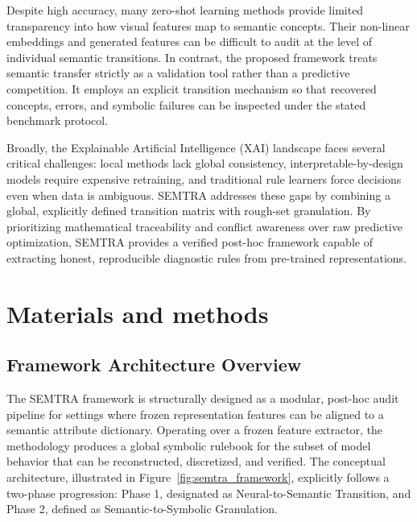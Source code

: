 \documentclass[make,article,submit,pdftex,moreauthors]{Definitions/mdpi}
\begin{document}
Despite high accuracy, many zero-shot learning methods provide limited transparency into how visual features map to semantic concepts. Their non-linear embeddings and generated features can be difficult to audit at the level of individual semantic transitions. In contrast, the proposed framework treats semantic transfer strictly as a validation tool rather than a predictive competition. It employs an explicit transition mechanism so that recovered concepts, errors, and symbolic failures can be inspected under the stated benchmark protocol.

Broadly, the Explainable Artificial Intelligence (XAI) landscape faces several critical challenges: local methods lack global consistency, interpretable-by-design models require expensive retraining, and traditional rule learners force decisions even when data is ambiguous. SEMTRA addresses these gaps by combining a global, explicitly defined transition matrix with rough-set granulation. By prioritizing mathematical traceability and conflict awareness over raw predictive optimization, SEMTRA provides a verified post-hoc framework capable of extracting honest, reproducible diagnostic rules from pre-trained representations.

\section{Materials and methods}
\label{sec:methods}

\subsection{Framework Architecture Overview}
\label{subsec:framework_overview}

The SEMTRA framework is structurally designed as a modular, post-hoc audit pipeline for settings where frozen representation features can be aligned to a semantic attribute dictionary. Operating over a frozen feature extractor, the methodology produces a global symbolic rulebook for the subset of model behavior that can be reconstructed, discretized, and verified. The conceptual architecture, illustrated in Figure~\ref{fig:semtra_framework}, explicitly follows a two-phase progression: Phase 1, designated as Neural-to-Semantic Transition, and Phase 2, defined as Semantic-to-Symbolic Granulation.
\end{document}
